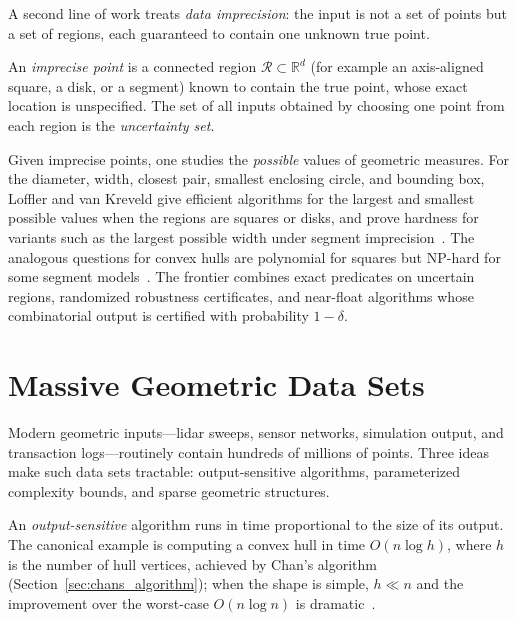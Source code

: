 A second
line of work treats \emph{data imprecision}: the input is not a set of points
but a set of regions, each guaranteed to contain one unknown true point.

\begin{definition}\label{def:frontiers_imprecise_point}
An \emph{imprecise point} is a connected region $\mathcal{R} \subset
\mathbb{R}^d$ (for example an axis-aligned square, a disk, or a segment) known
to contain the true point, whose exact location is unspecified. The set of all
inputs obtained by choosing one point from each region is the
\emph{uncertainty set}.
\end{definition}

Given imprecise points, one studies the \emph{possible} values of geometric
measures. For the diameter, width, closest pair, smallest enclosing circle, and
bounding box, Loffler and van Kreveld give efficient algorithms for the largest
and smallest possible values when the regions are squares or disks, and prove
hardness for variants such as the largest possible width under segment
imprecision~\cite{loffler2010largest}. The analogous questions for convex hulls
are polynomial for squares but NP-hard for some segment
models~\cite{loffler2010hulls}. The frontier combines exact predicates on
uncertain regions, randomized robustness certificates, and near-float
algorithms whose combinatorial output is certified with probability $1 -
\delta$.

\section{Massive Geometric Data Sets}
\label{sec:frontiers_massive_data}

Modern geometric inputs---lidar sweeps, sensor networks, simulation output,
and transaction logs---routinely contain hundreds of millions of points. Three
ideas make such data sets tractable: output-sensitive algorithms, parameterized
complexity bounds, and sparse geometric structures.

An \emph{output-sensitive} algorithm runs in
time proportional to the size of its output. The canonical example is computing
a convex hull in time $O(n \log h)$, where $h$ is the number of hull vertices,
achieved by Chan's algorithm (Section~\ref{sec:chans_algorithm}); when the
shape is simple, $h \ll n$ and the improvement over the worst-case $O(n \log
n)$ is dramatic~\cite{berg2008}.

